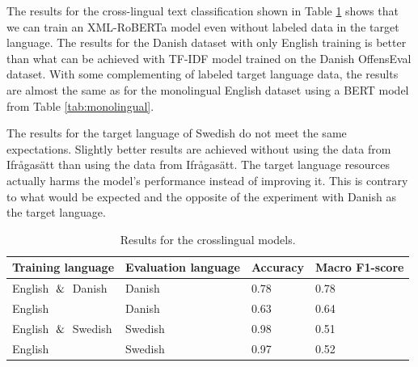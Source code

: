 \documentclass[nofilelist]{cslthse-msc}
\begin{document}
The results for the cross-lingual text classification shown in Table \ref{tab:crosslingual} shows that we can train an XML-RoBERTa model even without labeled data in the target language. The results for the Danish dataset with only English training is better than what can be achieved with TF-IDF model trained on the Danish OffensEval dataset. With some complementing of labeled target language data, the results are almost the same as for the monolingual English dataset using a BERT model from Table \ref{tab:monolingual}.

The results for the target language of Swedish do not meet the same expectations. Slightly better results are achieved without using the data from Ifrågasätt than using the data from Ifrågasätt. The target language resources actually harms the model's performance instead of improving it. This is contrary to what would be expected and the opposite of the experiment with Danish as the target language. 

\begin{table}[t]
\centering
\begin{tabular}{@{}llll@{}}
\toprule
Training language & Evaluation language & Accuracy & Macro F1-score  \\ \midrule
English $\And$ Danish & Danish & 0.78 & 0.78 \\
English & Danish & 0.63 & 0.64 \\
English $\And$ Swedish & Swedish & 0.98 & 0.51 \\
English & Swedish & 0.97 & 0.52 \\
\bottomrule
\end{tabular}
\caption{Results for the crosslingual models.}
\label{tab:crosslingual}
\end{table}
\end{document}
